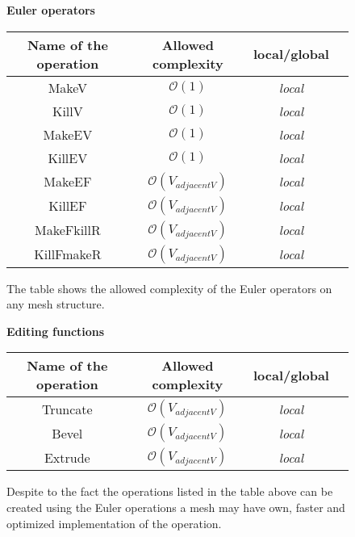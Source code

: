 \begin{figure}[!htbp]

\centering
\textbf{Euler operators}\\
\vspace{2mm}
\begin{tabular}{| c | c | c | c |}
\hline
\textbf{Name of the operation} & \textbf{Allowed complexity} & \textbf{local/global}\\
\hline
MakeV & $\mathcal{O}(1)$ & \emph{local}\\
\hline
KillV & $\mathcal{O}(1)$ & \emph{local}\\
\hline
MakeEV & $\mathcal{O}(1)$ & \emph{local}\\
\hline
KillEV & $\mathcal{O}(1)$ & \emph{local}\\
\hline
MakeEF & $\mathcal{O}(V_{adjacentV})$ & \emph{local}\\
\hline
KillEF & $\mathcal{O}(V_{adjacentV})$ & \emph{local}\\
\hline
MakeFkillR & $\mathcal{O}(V_{adjacentV})$ & \emph{local}\\
\hline
KillFmakeR & $\mathcal{O}(V_{adjacentV})$ & \emph{local}\\
\hline
\end{tabular}
\caption{The table shows the allowed complexity of the Euler operators on any mesh structure.
}
\end{figure}

\begin{figure}[!htbp]

\centering
\textbf{Editing functions}\\
\vspace{2mm}
\begin{tabular}{| c | c | c | c |}
\hline
\textbf{Name of the operation} & \textbf{Allowed complexity} & \textbf{local/global}\\
\hline
Truncate & $\mathcal{O}(V_{adjacentV})$ & \emph{local}\\
\hline
Bevel & $\mathcal{O}(V_{adjacentV})$ & \emph{local}\\
\hline
Extrude & $\mathcal{O}(V_{adjacentV})$ & \emph{local}\\
\hline
\end{tabular}
\caption{
Despite to the fact the operations listed in the table above can be created using the
Euler operations a mesh may have own, faster and optimized implementation of the operation.
}
\end{figure}

